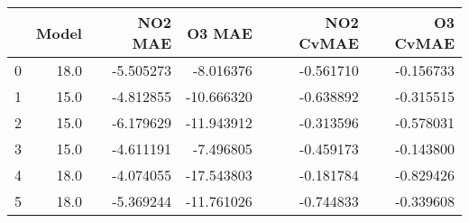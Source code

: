 \begin{tabular}{lrrrrr}
\toprule
{} &  Model &   NO2 MAE &     O3 MAE &  NO2 CvMAE &  O3 CvMAE \\
\midrule
0 &   18.0 & -5.505273 &  -8.016376 &  -0.561710 & -0.156733 \\
1 &   15.0 & -4.812855 & -10.666320 &  -0.638892 & -0.315515 \\
2 &   15.0 & -6.179629 & -11.943912 &  -0.313596 & -0.578031 \\
3 &   15.0 & -4.611191 &  -7.496805 &  -0.459173 & -0.143800 \\
4 &   18.0 & -4.074055 & -17.543803 &  -0.181784 & -0.829426 \\
5 &   18.0 & -5.369244 & -11.761026 &  -0.744833 & -0.339608 \\
\bottomrule
\end{tabular}
